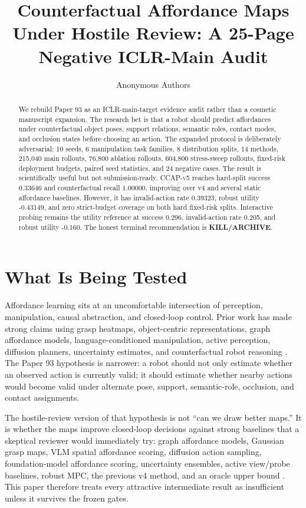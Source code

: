 \documentclass{article}
\title{Counterfactual Affordance Maps Under Hostile Review: A 25-Page Negative ICLR-Main Audit}
\author{Anonymous Authors}
\newcommand{\method}{\textsc{CCAP-v5}}
\newcommand{\terminal}{\textsc{KILL/ARCHIVE}}
\begin{document}
\maketitle

\begin{abstract}
We rebuild Paper 93 as an ICLR-main-target evidence audit rather than a cosmetic manuscript expansion. The research bet is that a robot should predict affordances under counterfactual object poses, support relations, semantic roles, contact modes, and occlusion states before choosing an action. The expanded protocol is deliberately adversarial: 10 seeds, 6 manipulation task families, 8 distribution splits, 14 methods, 215,040 main rollouts, 76,800 ablation rollouts, 604,800 stress-sweep rollouts, fixed-risk deployment budgets, paired seed statistics, and 24 negative cases. The result is scientifically useful but not submission-ready. \method{} reaches hard-split success 0.33646 and counterfactual recall 1.00000, improving over v4 and several static affordance baselines. However, it has invalid-action rate 0.39323, robust utility -0.43149, and zero strict-budget coverage on both hard fixed-risk splits. Interactive probing remains the utility reference at success 0.296, invalid-action rate 0.205, and robust utility -0.160. The honest terminal recommendation is \textbf{\terminal}.
\end{abstract}

\section{What Is Being Tested}
Affordance learning sits at an uncomfortable intersection of perception, manipulation, causal abstraction, and closed-loop control. Prior work has made strong claims using grasp heatmaps, object-centric representations, graph affordance models, language-conditioned manipulation, active perception, diffusion planners, uncertainty estimates, and counterfactual robot reasoning \citep{r1011770278364919868017,r101109iros20157354029,r1011771059712307084689,r103390s24206691,r10117702783649241269337,r101109iros55552202310341666,r251103165v1,r1011771729881417743029}. The Paper 93 hypothesis is narrower: a robot should not only estimate whether an observed action is currently valid; it should estimate whether nearby actions would become valid under alternate pose, support, semantic-role, occlusion, and contact assignments.

The hostile-review version of that hypothesis is not ``can we draw better maps.'' It is whether the maps improve closed-loop decisions against strong baselines that a skeptical reviewer would immediately try: graph affordance models, Gaussian grasp maps, VLM spatial affordance scoring, diffusion action sampling, foundation-model affordance scoring, uncertainty ensembles, active view/probe baselines, robust MPC, the previous v4 method, and an oracle upper bound \citep{r101109tro20253578227,r101109jproc2006876965,r250306227v1,r1048550arxiv221206088,r1010800169186420222029762,r101017s026357471100049x,r1015607rss2022xviii003,r105194egusphereegu237081}. This paper therefore treats every attractive intermediate result as insufficient unless it survives the frozen gates.
\end{document}
